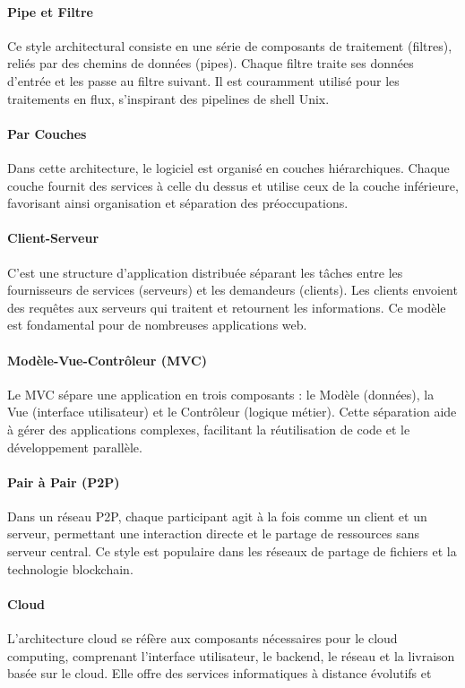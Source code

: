\documentclass[16pt]{report}
\begin{document}
\begin{multicols*}{2}
\paragraph{Pipe et Filtre}
Ce style architectural consiste en une série de composants de traitement (filtres), reliés par des chemins de données (pipes). Chaque filtre traite ses données d'entrée et les passe au filtre suivant. Il est couramment utilisé pour les traitements en flux, s'inspirant des pipelines de shell Unix.

\paragraph{Par Couches}
Dans cette architecture, le logiciel est organisé en couches hiérarchiques. Chaque couche fournit des services à celle du dessus et utilise ceux de la couche inférieure, favorisant ainsi organisation et séparation des préoccupations.

\paragraph{Client-Serveur}
C'est une structure d'application distribuée séparant les tâches entre les fournisseurs de services (serveurs) et les demandeurs (clients). Les clients envoient des requêtes aux serveurs qui traitent et retournent les informations. Ce modèle est fondamental pour de nombreuses applications web.

\paragraph{Modèle-Vue-Contrôleur (MVC)}
Le MVC sépare une application en trois composants : le Modèle (données), la Vue (interface utilisateur) et le Contrôleur (logique métier). Cette séparation aide à gérer des applications complexes, facilitant la réutilisation de code et le développement parallèle.

\paragraph{Pair à Pair (P2P)}
Dans un réseau P2P, chaque participant agit à la fois comme un client et un serveur, permettant une interaction directe et le partage de ressources sans serveur central. Ce style est populaire dans les réseaux de partage de fichiers et la technologie blockchain.

\paragraph{Cloud}
L'architecture cloud se réfère aux composants nécessaires pour le cloud computing, comprenant l'interface utilisateur, le backend, le réseau et la livraison basée sur le cloud. Elle offre des services informatiques à distance évolutifs et



\end{multicols*}
\end{document}
